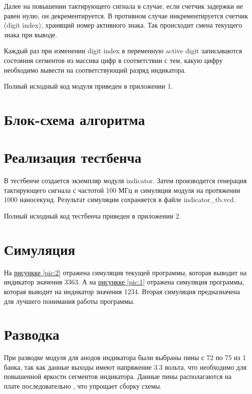 Далее на повышении тактирующего сигнала в случае, если счетчик задержки не равен нулю, он декрементируется. В противном случае инкрементируется счетчик (digit index), хранящий номер активного знака. 
Так происходит смена текущего знака при выводе.

Каждый раз при изменении digit index в переменную active digit записываются состояния сегментов из массива цифр в соответствии с тем, какую цифру необходимо вывести на соответствующий разряд индикатора.

Полный исходный код модуля приведен в приложении 1.

\section{Блок-схема алгоритма}


\section{Реализация тестбенча}

В тестбенче создается экземпляр модуля indicator.
Затем производится генерация тактирующего сигнала с частотой 100 МГц и симуляция модуля на протяжении 1000 наносекунд.
Результат симуляции сохраняется в файле indicator\_tb.vcd.

Полный исходный код тестбенча приведен в приложении 2.

\section{Симуляция}
На \hyperref[pic:2]{рисункке \ref*{pic:2}} отражена симуляция текущей программы, которая выводит на индикатор значения 3363.
А на \hyperref[pic:1]{рисункке \ref*{pic:1}} отражена симуляция программы, которая выводит на индикатор значения 1234.
Вторая симуляция предназначена для лучшего понимания работы программы.


\section{Разводка}

При разводке модуля для анодов индикатора были выбраны пины с 72 по 75 из 1 банка, так как данные выходы имеют напряжение 3.3 вольта, что необходимо для повышенной яркости сегментов индикатора. Данные пины располагаются на плате последовательно , что упрощает сборку схемы.

